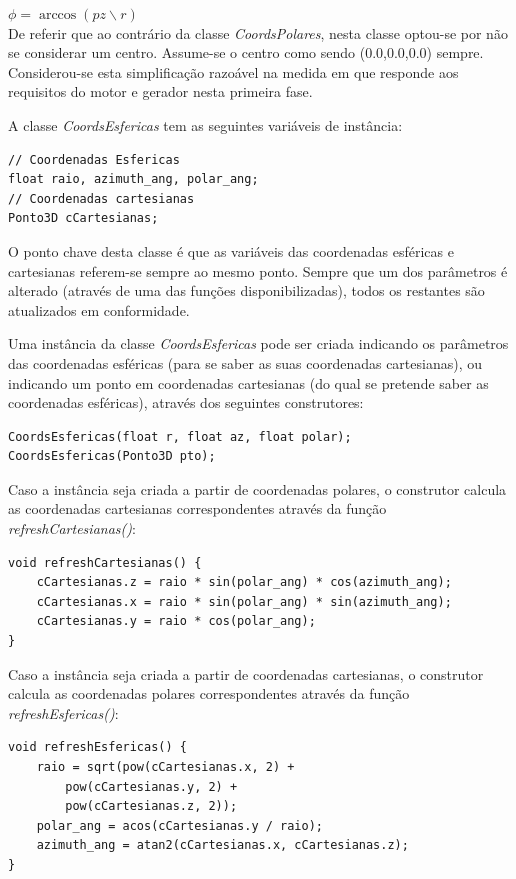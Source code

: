 		$\phi = \arccos (pz \backslash r)$\\

De referir que ao contrário da classe \textit{CoordsPolares}, nesta classe optou-se por não se considerar um centro. Assume-se o centro como sendo (0.0,0.0,0.0) sempre. Considerou-se esta simplificação razoável na medida em que responde aos requisitos do motor e gerador nesta primeira fase.

A classe \textit{CoordsEsfericas} tem as seguintes variáveis de instância:

\begin{Verbatim}
// Coordenadas Esfericas
float raio, azimuth_ang, polar_ang;
// Coordenadas cartesianas
Ponto3D cCartesianas;
\end{Verbatim}

O ponto chave desta classe é que as variáveis das coordenadas esféricas e cartesianas referem-se sempre ao mesmo ponto. Sempre que um dos parâmetros é alterado (através de uma das funções disponibilizadas), todos os restantes são atualizados em conformidade.

Uma instância da classe \textit{CoordsEsfericas} pode ser criada indicando os parâmetros das coordenadas esféricas (para se saber as suas coordenadas cartesianas), ou indicando um ponto em coordenadas cartesianas (do qual se pretende saber as coordenadas esféricas), através dos seguintes construtores:

\begin{Verbatim}
CoordsEsfericas(float r, float az, float polar);
CoordsEsfericas(Ponto3D pto);
\end{Verbatim}

Caso a instância seja criada a partir de coordenadas polares, o construtor calcula as coordenadas cartesianas correspondentes através da função \textit{refreshCartesianas()}:

\begin{Verbatim}
void refreshCartesianas() {
	cCartesianas.z = raio * sin(polar_ang) * cos(azimuth_ang);
	cCartesianas.x = raio * sin(polar_ang) * sin(azimuth_ang);
	cCartesianas.y = raio * cos(polar_ang);
}
\end{Verbatim}

Caso a instância seja criada a partir de coordenadas cartesianas, o construtor calcula as coordenadas polares correspondentes através da função \textit{refreshEsfericas()}:

\begin{Verbatim}
void refreshEsfericas() {
	raio = sqrt(pow(cCartesianas.x, 2) + 
		pow(cCartesianas.y, 2) + 
		pow(cCartesianas.z, 2));
	polar_ang = acos(cCartesianas.y / raio);
	azimuth_ang = atan2(cCartesianas.x, cCartesianas.z);
}
\end{Verbatim}

